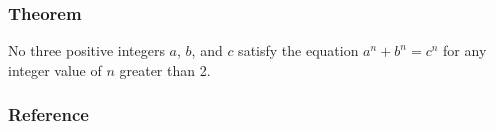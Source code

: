 \documentclass[hyperref={colorlinks=true,citecolor=green,linkcolor=red}]{beamer}
\begin{document}
\begin{frame}
   \frametitle{Theorem}
   \begin{theorem}
      No three positive integers $a$, $b$, and $c$ satisfy the equation $a^n + b^n = c^n$ for any integer value of $n$ greater than 2.
      \label{th:testTheorem}
   \end{theorem}
\end{frame}


\begin{frame}
   \frametitle{Reference}
   
   
\end{frame}
\end{document}
